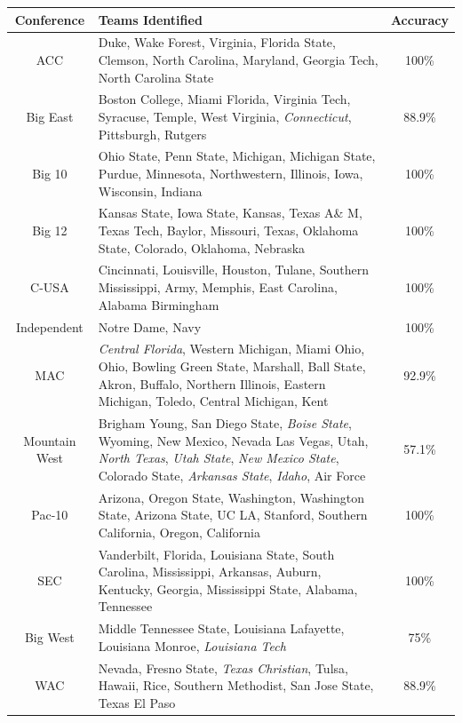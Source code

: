 \documentclass{article}\usepackage[]{graphicx}\usepackage[]{color}
\begin{document}
\begin{table}[H]
\centering
\begin{tabular}{cp{10cm}c}
  \hline
Conference & Teams Identified & Accuracy \\ 
  \hline
ACC & Duke,  Wake Forest,  Virginia,  Florida State,  Clemson,  North Carolina,  Maryland,  Georgia Tech,  North Carolina State & 100\% \\ 
  Big East & Boston College,  Miami Florida,  Virginia Tech,  Syracuse,  Temple,  West Virginia, {\it  Connecticut},  Pittsburgh,  Rutgers & 88.9\% \\ 
  Big 10 & Ohio State,  Penn State,  Michigan,  Michigan State,  Purdue,  Minnesota,  Northwestern,  Illinois,  Iowa,  Wisconsin,  Indiana & 100\% \\ 
  Big 12 & Kansas State,  Iowa State,  Kansas,  Texas A\& M,  Texas Tech,  Baylor,  Missouri,  Texas,  Oklahoma State,  Colorado,  Oklahoma,  Nebraska & 100\% \\ 
  C-USA & Cincinnati,  Louisville,  Houston,  Tulane,  Southern Mississippi,  Army,  Memphis,  East Carolina,  Alabama Birmingham & 100\% \\ 
  Independent & Notre Dame,  Navy & 100\% \\ 
  MAC & {\it  Central Florida},  Western Michigan,  Miami Ohio,  Ohio,  Bowling Green State,  Marshall,  Ball State,  Akron,  Buffalo,  Northern Illinois,  Eastern Michigan,  Toledo,  Central Michigan,  Kent & 92.9\% \\ 
  Mountain West & Brigham Young,  San Diego State, {\it  Boise State},  Wyoming,  New Mexico,  Nevada Las Vegas,  Utah, {\it  North Texas}, {\it  Utah State}, {\it  New Mexico State},  Colorado State, {\it  Arkansas State}, {\it  Idaho},  Air Force & 57.1\% \\ 
  Pac-10 & Arizona,  Oregon State,  Washington,  Washington State,  Arizona State,  UC LA,  Stanford,  Southern California,  Oregon,  California & 100\% \\ 
  SEC & Vanderbilt,  Florida,  Louisiana State,  South Carolina,  Mississippi,  Arkansas,  Auburn,  Kentucky,  Georgia,  Mississippi State,  Alabama,  Tennessee & 100\% \\ 
  Big West & Middle Tennessee State,  Louisiana Lafayette,  Louisiana Monroe, {\it  Louisiana Tech} & 75\% \\ 
  WAC & Nevada,  Fresno State, {\it  Texas Christian},  Tulsa,  Hawaii,  Rice,  Southern Methodist,  San Jose State,  Texas El Paso & 88.9\% \\ 
   \hline
\end{tabular}
\label{tab:football_final}
\end{table}
\end{document}
